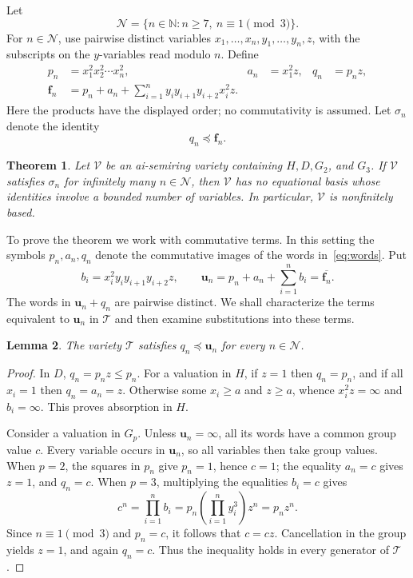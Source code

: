 \documentclass[10pt,a4paper]{amsart}
\newtheorem{theorem}{Theorem}[section]
\newtheorem{lemma}[theorem]{Lemma}
\newcommand{\T}{\mathcal T}
\newcommand{\Ncal}{\mathcal N}
\newcommand{\bu}{\mathbf u}
\newcommand{\bfam}{\mathbf f}
\numberwithin{equation}{section}
\begin{document}
Let
\[
\Ncal=\{n\in\mathbb N:n\geq7,\ n\equiv1\pmod3\}.
\]
For $n\in\Ncal$, use pairwise distinct variables
$x_1,\ldots,x_n,y_1,\ldots,y_n,z$, with the subscripts on the $y$-variables
read modulo $n$. Define
\begin{align}
p_n&=x_1^2x_2^2\cdots x_n^2,& a_n&=x_1^2z,& q_n&=p_nz,
\label{eq:words}\\
\bfam_n&=p_n+a_n+\sum_{i=1}^n y_i y_{i+1}y_{i+2}x_i^2z.
\label{eq:family}
\end{align}
Here the products have the displayed order; no commutativity is assumed.
Let $\sigma_n$ denote the identity
\begin{equation}\label{eq:sigma}
q_n\preceq\bfam_n.
\end{equation}


\begin{theorem}\label{thm:criterion}
Let $\mathcal V$ be an ai-semiring variety containing $H,D,G_2$, and
$G_3$. If $\mathcal V$ satisfies $\sigma_n$ for infinitely many
$n\in\Ncal$, then $\mathcal V$ has no equational basis whose identities
involve a bounded number of variables. In particular, $\mathcal V$ is
nonfinitely based.
\end{theorem}


To prove the theorem we work with commutative terms. In this setting the
symbols $p_n,a_n,q_n$ denote the commutative images of the words
in~\eqref{eq:words}. Put
\begin{equation}\label{eq:u}
b_i=x_i^2y_i y_{i+1}y_{i+2}z,\qquad
\bu_n=p_n+a_n+\sum_{i=1}^n b_i=\overline{\bfam_n}.
\end{equation}
The words in $\bu_n+q_n$ are pairwise distinct. We shall characterize the
terms equivalent to $\bu_n$ in $\T$ and then examine substitutions into
these terms.

\begin{lemma}\label{lem:validT}
The variety $\T$ satisfies $q_n\preceq\bu_n$ for every $n\in\Ncal$.
\end{lemma}
\begin{proof}
In $D$, $q_n=p_nz\leq p_n$. For a valuation in $H$, if $z=1$ then
$q_n=p_n$, and if all $x_i=1$ then $q_n=a_n=z$. Otherwise some
$x_i\geq a$ and $z\geq a$, whence $x_i^2z=\infty$ and $b_i=\infty$.
This proves absorption in $H$.

Consider a valuation in $G_p$. Unless $\bu_n=\infty$, all its words
have a common group value $c$. Every variable occurs in $\bu_n$, so all
variables then take group values. When $p=2$, the squares in $p_n$ give
$p_n=1$, hence $c=1$; the equality $a_n=c$ gives $z=1$, and $q_n=c$.
When $p=3$, multiplying the equalities $b_i=c$ gives
\[
c^n=\prod_{i=1}^n b_i
=p_n\left(\prod_{i=1}^n y_i^3\right)z^n=p_nz^n.
\]
Since $n\equiv1\pmod3$ and $p_n=c$, it follows that $c=cz$. Cancellation
in the group yields $z=1$, and again $q_n=c$. Thus the inequality holds
in every generator of $\T$.
\end{proof}
\end{document}
